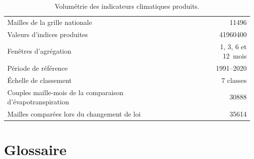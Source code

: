 \begin{table}[H]
\centering
\caption{Volumétrie des indicateurs climatiques produits.}
\label{tab:volumetrie-indices}
\begin{tabularx}{\textwidth}{@{}Xr@{}}
\toprule
Mailles de la grille nationale & \num{11496} \\
Valeurs d'indices produites & \num{41960400} \\
Fenêtres d'agrégation & 1, 3, 6 et 12~mois \\
Période de référence & 1991--2020 \\
Échelle de classement & 7 classes \\
Couples maille-mois de la comparaison d'évapotranspiration & \num{30888} \\
Mailles comparées lors du changement de loi & \num{35614} \\
\bottomrule
\end{tabularx}
\end{table}

\section{Glossaire}

